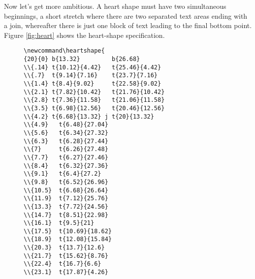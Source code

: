 \documentclass[draft]{article}
\makeatletter
\DeclareRobustCommand{\_}{%
  \ifmmode \nfss@text{\textunderscore}\else \BreakableUnderscore \fi}
\makeatother
\begin{document}

Now let's get more ambitious.  A heart shape must have two simultaneous
beginnings, a short stretch where there are two separated text areas
ending with a join,
whereafter there is just one block of text leading to the final
bottom point.  Figure \ref{fig:heart} shows the heart-shape
specification.
\begin{figure}[tbp]
\begin{small}
\begin{minipage}[b]{21em}
\renewcommand{\baselinestretch}{.9}\selectfont
\begin{verbatim}
\newcommand\heartshape{
{20}{0} b{13.32}         b{26.68}
\\{.14} t{10.12}{4.42}   t{25.46}{4.42}
\\{.7}  t{9.14}{7.16}    t{23.7}{7.16}
\\{1.4} t{8.4}{9.02}     t{22.58}{9.02}
\\{2.1} t{7.82}{10.42}   t{21.76}{10.42}
\\{2.8} t{7.36}{11.58}   t{21.06}{11.58}
\\{3.5} t{6.98}{12.56}   t{20.46}{12.56}
\\{4.2} t{6.68}{13.32} j t{20}{13.32}
\\{4.9}   t{6.48}{27.04}
\\{5.6}   t{6.34}{27.32}
\\{6.3}   t{6.28}{27.44}
\\{7}     t{6.26}{27.48}
\\{7.7}   t{6.27}{27.46}
\\{8.4}   t{6.32}{27.36}
\\{9.1}   t{6.4}{27.2}
\\{9.8}   t{6.52}{26.96}
\\{10.5}  t{6.68}{26.64}
\\{11.9}  t{7.12}{25.76}
\\{13.3}  t{7.72}{24.56}
\\{14.7}  t{8.51}{22.98}
\\{16.1}  t{9.5}{21}
\\{17.5}  t{10.69}{18.62}
\\{18.9}  t{12.08}{15.84}
\\{20.3}  t{13.7}{12.6}
\\{21.7}  t{15.62}{8.76}
\\{22.4}  t{16.7}{6.6}
\\{23.1}  t{17.87}{4.26}

\end{verbatim}
\end{minipage}
\end{small}
\end{figure}
\end{document}
